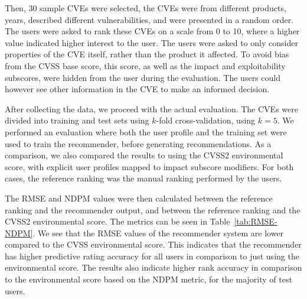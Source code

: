 {Then, 30 sample CVEs were selected, the CVEs were from different products, years, described different vulnerabilities, and were presented in a random order.
The users were asked to rank these CVEs on a scale from 0 to 10, where a higher value indicated higher interest to the user.
The users were asked to only consider properties of the CVE itself, rather than the product it affected.
To avoid bias from the CVSS base score, this score, as well as the impact and exploitability subscores, were hidden from the user during the evaluation.
The users could however see other information in the CVE to make an informed decision.

After collecting the data, we proceed with the actual evaluation.
The CVEs were divided into training and test sets using $k$-fold cross-validation, using $k=5$.
We performed an evaluation where both the user profile and the training set were used to train the recommender, before generating recommendations.
As a comparison, we also compared the results to using the CVSS2 environmental score, with explicit user profiles mapped to impact subscore modifiers.
For both cases, the reference ranking was the manual ranking performed by the users.

The RMSE and NDPM values were then calculated between the reference ranking and the recommender output, and between the reference ranking and the CVSS2 environmental score.
The metrics can be seen in Table~\ref{tab:RMSE-NDPM}.
We see that the RMSE values of the recommender system are lower compared to the CVSS environmental score.
This indicates that the recommender has higher predictive rating accuracy for all users in comparison to just using the environmental score.
The results also indicate higher rank accuracy in comparison to the environmental score based on the NDPM metric, for the majority of test users.

}
